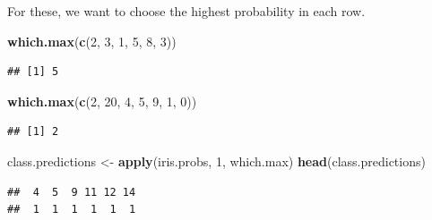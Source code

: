 \documentclass[]{article}
\newenvironment{Shaded}{\begin{snugshade}}{\end{snugshade}}
\newcommand{\KeywordTok}[1]{\textcolor[rgb]{0.13,0.29,0.53}{\textbf{#1}}}
\newcommand{\DecValTok}[1]{\textcolor[rgb]{0.00,0.00,0.81}{#1}}
\newcommand{\StringTok}[1]{\textcolor[rgb]{0.31,0.60,0.02}{#1}}
\newcommand{\OperatorTok}[1]{\textcolor[rgb]{0.81,0.36,0.00}{\textbf{#1}}}
\newcommand{\NormalTok}[1]{#1}
\begin{document}
For these, we want to choose the highest probability in each row.

\begin{Shaded}
\begin{Highlighting}[]
\KeywordTok{which.max}\NormalTok{(}\KeywordTok{c}\NormalTok{(}\DecValTok{2}\NormalTok{, }\DecValTok{3}\NormalTok{, }\DecValTok{1}\NormalTok{, }\DecValTok{5}\NormalTok{, }\DecValTok{8}\NormalTok{, }\DecValTok{3}\NormalTok{))}
\end{Highlighting}
\end{Shaded}

\begin{verbatim}
## [1] 5
\end{verbatim}

\begin{Shaded}
\begin{Highlighting}[]
\KeywordTok{which.max}\NormalTok{(}\KeywordTok{c}\NormalTok{(}\DecValTok{2}\NormalTok{, }\DecValTok{20}\NormalTok{, }\DecValTok{4}\NormalTok{, }\DecValTok{5}\NormalTok{, }\DecValTok{9}\NormalTok{, }\DecValTok{1}\NormalTok{, }\DecValTok{0}\NormalTok{))}
\end{Highlighting}
\end{Shaded}

\begin{verbatim}
## [1] 2
\end{verbatim}

\begin{Shaded}
\begin{Highlighting}[]
\NormalTok{class.predictions <-}\StringTok{ }\KeywordTok{apply}\NormalTok{(iris.probs, }\DecValTok{1}\NormalTok{, which.max)}
\KeywordTok{head}\NormalTok{(class.predictions)}
\end{Highlighting}
\end{Shaded}

\begin{verbatim}
##  4  5  9 11 12 14 
##  1  1  1  1  1  1
\end{verbatim}

\begin{Shaded}
\end{Shaded}
\end{document}

